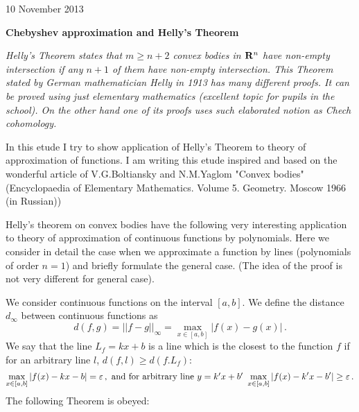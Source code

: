 
\def\p{\partial}
\def\t {\tilde}
\def \m {\medskip}
\def\degree {{\bf {\rm degree}\,\,}}
\def \finish {${\,\,\vrule height1mm depth2mm width 8pt}$}

\def\a {\alpha}
\def\vare{{\varepsilon}}
\def\l {\lambda}
\def\s {{\sigma}}

\def\G {{\Gamma}}

\def\A {{\bf A}}
\def\C {{\bf C}}
\def\E  {{\bf E}}
\def\K {{\bf K}}
\def\N {{\bf N}}
\def\Q {{\bf Q}}
\def\R  {{\bf R}}
\def\V {{\cal V}}
\def \X   {{\bf X}}
\def \Y   {{\bf Y}}
\def\Z {{\bf Z}}



\def\ac {{\bf a}}
\def\e{{\bf e}}
\def\f {{\bf f}}
\def\n {{\bf n}}
\def\r {{\bf r}}
\def\v {{\bf v}}
\def \x   {{\bf x}}
\def \y   {{\bf y}}


\def\pt {{\bf pt}}



10 November 2013


\centerline {\bf Chebyshev approximation and Helly's Theorem}

\m

  {\it  Helly's Theorem states that $m\geq n+2$ convex bodies in $\R^{n}$
 have non-empty intersection if any $n+1$ of them have non-empty intersection.
This Theorem stated by German mathematician Helly in 1913 has
many different proofs.
It can be proved using just  elementary mathematics
(excellent topic for pupils in the school). On the other hand 
one of its proofs uses such elaborated notion as Chech cohomology.

  In this etude I try to show application of Helly's Theorem
to theory of approximation of functions.
  I am writing this etude inspired and 
based on the wonderful article
of V.G.Boltiansky and N.M.Yaglom "Convex bodies"
(Encyclopaedia of Elementary Mathematics. Volume 5. Geometry. Moscow 1966
(in Russian)) 
}

\m



Helly's theorem on convex bodies have the 
following very interesting application to theory of approximation
of continuous functions by polynomials.  Here we 
consider in detail the case when we approximate a function by lines
(polynomials of order $n=1$) and briefly formulate the general case.
(The idea of the proof is not very different for general case).

We consider continuous functions on the interval $[a,b]$. 
We define the distance $d_\infty$ between continuous functions as
            $$
    d(f,g)=||f-g||_\infty=\max_{x\in [a,b]}|f(x)-g(x)|\,.
            $$
  We say that the line $L_f=kx+b$ is a line which is the closest 
to the function $f$ if for an arbitrary line $l$,
  $d(f,l)\geq d(f.L_f)$:
           $$
\max_{x\in [a,b]}|f(x)-kx-b|=\vare\,,\,\,
\hbox{and for arbitrary line $y=k'x+b'$}\,\,    
\max_{x\in [a,b]}|f(x)-k'x-b'|\geq\vare\,.
           $$
The following Theorem is obeyed:

